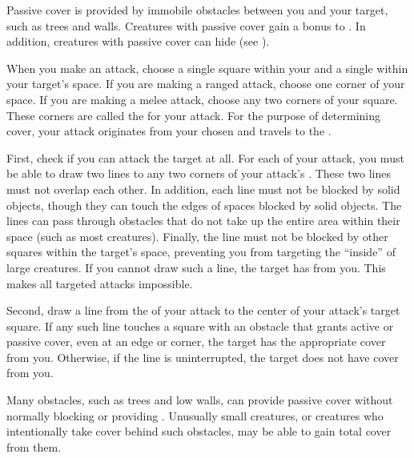             \label{Passive Cover} Passive cover is provided by immobile obstacles between you and your target, such as trees and walls.
            Creatures with passive cover gain a  bonus to .
            In addition, creatures with passive cover can hide (see ).


            When you make an attack, choose a single square within your  and a single  within your target's space.
            If you are making a ranged attack, choose one corner of your space.
            If you are making a melee attack, choose any two corners of your square.
            These corners are called the  for your attack.
            For the purpose of determining cover, your attack originates from your chosen  and travels to the .

            First, check if you can attack the target at all.
            For each  of your attack, you must be able to draw two lines to any two corners of your attack's .
            These two lines must not overlap each other.
            In addition, each line must not be blocked by solid objects, though they can touch the edges of spaces blocked by solid objects.
            The lines can pass through obstacles that do not take up the entire area within their space (such as most creatures).
            Finally, the line must not be blocked by other squares within the target's space, preventing you from targeting the ``inside'' of large creatures.
            If you cannot draw such a line, the target has  from you.
            This makes all targeted attacks impossible.

            Second, draw a line from the  of your attack to the center of your attack's target square.
            If any such line touches a square with an obstacle that grants active or passive cover, even at an edge or corner, the target has the appropriate cover from you.
            Otherwise, if the line is uninterrupted, the target does not have cover from you.

             Many obstacles, such as trees and low walls, can provide passive cover without normally blocking  or providing .
            Unusually small creatures, or creatures who intentionally take cover behind such obstacles, may be able to gain total cover from them.

